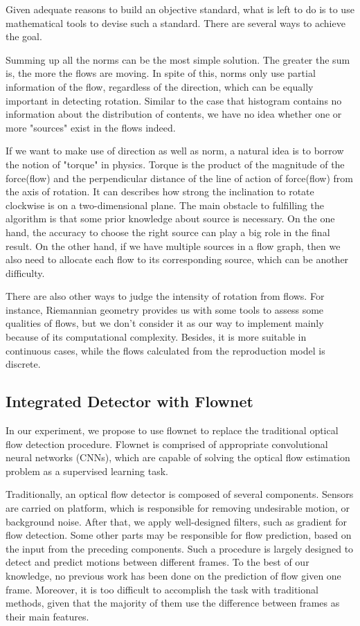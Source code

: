\documentclass[journal]{IEEEtran}
\begin{document}
  
  Given adequate reasons to build an objective standard, what is left to do is to use mathematical tools to devise such a standard. There are several ways to achieve the goal.
  
  Summing up all the norms can be the most simple solution. The greater the sum is, the more the flows are moving. In spite of this, norms only use partial information of the flow, regardless of the direction, which can be equally important in detecting rotation. Similar to the case that histogram contains no information about the distribution of contents, we have no idea whether one or more "sources" exist in the flows indeed.
  
  If we want to make use of direction as well as norm, a natural idea is to borrow the notion of "torque" in physics. Torque is the product of the magnitude of the force(flow) and the perpendicular distance of the line of action of force(flow) from the axis of rotation. It can describes how strong the inclination to rotate clockwise is on a two-dimensional plane. The main obstacle to fulfilling the algorithm is that some prior knowledge about source is necessary. On the one hand, the accuracy to choose the right source can play a big role in the final result. On the other hand, if we have multiple sources in a flow graph, then we also need to allocate each flow to its corresponding source, which can be another difficulty.
  
  There are also other ways to judge the intensity of rotation from flows. For instance, Riemannian geometry provides us with some tools to assess some qualities of flows, but we don't consider it as our way to implement mainly because of its computational complexity. Besides, it is more suitable in continuous cases, while the flows calculated from the reproduction model is discrete.
  
  \subsection{Integrated Detector with Flownet}
  \label{sec:detection_idf}
  
  In our experiment, we propose to use flownet to replace the traditional optical flow detection procedure. Flownet is comprised of appropriate convolutional neural networks (CNNs), which are capable of solving the optical flow estimation problem as a supervised learning task.
  
  Traditionally, an optical flow detector is composed of several components. Sensors are carried on platform, which is responsible for removing undesirable motion, or background noise. \cite{sebok1997optical} After that, we apply well-designed filters, such as gradient for flow detection. \cite{naoya1990optical} Some other parts may be responsible for flow prediction, based on the input from the preceding components. Such a procedure is largely designed to detect and predict motions between different frames. To the best of our knowledge,  no previous work has been done on the prediction of flow given one frame. Moreover, it is too difficult to accomplish the task with traditional methods, given that the majority of them use the difference between frames as their main features. 
  
\end{document}
